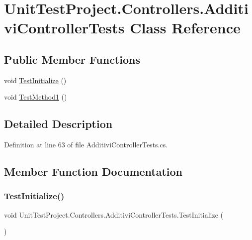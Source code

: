 \hypertarget{class_unit_test_project_1_1_controllers_1_1_additivi_controller_tests}{}\section{Unit\+Test\+Project.\+Controllers.\+Additivi\+Controller\+Tests Class Reference}
\label{class_unit_test_project_1_1_controllers_1_1_additivi_controller_tests}
\subsection*{Public Member Functions}
\begin{DoxyCompactItemize}
\item 
void \mbox{\hyperlink{class_unit_test_project_1_1_controllers_1_1_additivi_controller_tests_abf8b9df363cd396e633f7fd2ce2e6122}{Test\+Initialize}} ()
\item 
void \mbox{\hyperlink{class_unit_test_project_1_1_controllers_1_1_additivi_controller_tests_abd3f43d055236003db155c91b86f92bd}{Test\+Method1}} ()
\end{DoxyCompactItemize}


\subsection{Detailed Description}


Definition at line 63 of file Additivi\+Controller\+Tests.\+cs.



\subsection{Member Function Documentation}
\mbox{\label{class_unit_test_project_1_1_controllers_1_1_additivi_controller_tests_abf8b9df363cd396e633f7fd2ce2e6122}} 
\subsubsection{\texorpdfstring{Test\+Initialize()}{TestInitialize()}}
{\footnotesize\ttfamily void Unit\+Test\+Project.\+Controllers.\+Additivi\+Controller\+Tests.\+Test\+Initialize (\begin{DoxyParamCaption}{ }\end{DoxyParamCaption})}



